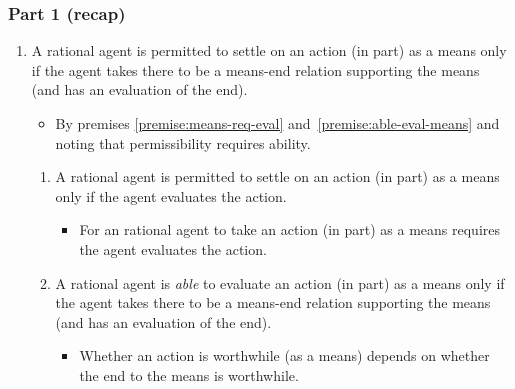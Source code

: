 \documentclass[noamssymb,
]{beamer} %
\begin{document}
\begin{frame}
  \frametitle{Part 1 (recap)}

  \begin{enumerate}
\item A rational agent is permitted to settle on an action (in part) as a means only if the agent takes there to be a means-end relation supporting the means (and has an evaluation of the end).
    \begin{itemize}
    \item By premises \ref{premise:means-req-eval} and~\ref{premise:able-eval-means} and noting that permissibility requires ability.
    \end{itemize}
  \begin{enumerate}
  \item A rational agent is permitted to settle on an action (in part) as a means only if the agent evaluates the action.
    \begin{itemize}
    \item For an rational agent to take an action (in part) as a means requires the agent evaluates the action.
    \end{itemize}
  \item A rational agent is \emph{able} to evaluate an action (in part) as a means only if the agent takes there to be a means-end relation supporting the means (and has an evaluation of the end).
    \begin{itemize}
    \item Whether an action is worthwhile (as a means) depends on whether the end to the means is worthwhile.
    \end{itemize}
  \end{enumerate}
\end{enumerate}

\end{frame}
\end{document}
